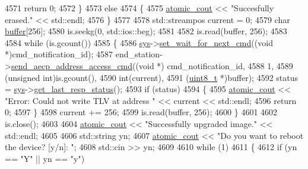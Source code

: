 \begin{DoxyCode}
4571             \textcolor{keywordflow}{return} 0;
4572         \}
4573         \textcolor{keywordflow}{else}
4574         \{
4575             \hyperlink{cmd__line_8h_a0bc38ccc65c79ba06c6fcd7b4bf554c3}{atomic\_cout} << \textcolor{stringliteral}{"Succesfully erased."} << std::endl;
4576         \}
4577 
4578         std::streampos current = 0;
4579         \textcolor{keywordtype}{char} \hyperlink{_hello_test_8cpp_a8be6d469a7cd1c8d66cc6d2d1e10c65b}{buffer}[256];
4580         is.seekg(0, std::ios::beg);
4581 
4582         is.read(buffer, 256);
4583 
4584         \textcolor{keywordflow}{while} (is.gcount())
4585         \{
4586             \hyperlink{classcmd__line_a485db4800e331cb4052c447fdf5d154e}{sys}->\hyperlink{classavdecc__lib_1_1system_a26b769584f10225077da47583edda33e}{set\_wait\_for\_next\_cmd}((\textcolor{keywordtype}{void} *)cmd\_notification\_id);
4587             end\_station->\hyperlink{classavdecc__lib_1_1end__station_acf650400905c50722aab71ac7fa4f44c}{send\_aecp\_address\_access\_cmd}((\textcolor{keywordtype}{void} *)
      cmd\_notification\_id,
4588                                                       1,
4589                                                       (\textcolor{keywordtype}{unsigned} \textcolor{keywordtype}{int})is.gcount(),
4590                                                       int(current),
4591                                                       (\hyperlink{stdint_8h_aba7bc1797add20fe3efdf37ced1182c5}{uint8\_t} *)buffer);
4592             status = \hyperlink{classcmd__line_a485db4800e331cb4052c447fdf5d154e}{sys}->\hyperlink{classavdecc__lib_1_1system_aa63e8d1a4e51f695cdcccc9340922407}{get\_last\_resp\_status}();
4593             \textcolor{keywordflow}{if} (status)
4594             \{
4595                 \hyperlink{cmd__line_8h_a0bc38ccc65c79ba06c6fcd7b4bf554c3}{atomic\_cout} << \textcolor{stringliteral}{"Error: Could not write TLV at address "} << current << std::endl;
4596                 \textcolor{keywordflow}{return} 0;
4597             \}
4598             current += 256;
4599             is.read(buffer, 256);
4600         \}
4601 
4602         is.close();
4603 
4604         \hyperlink{cmd__line_8h_a0bc38ccc65c79ba06c6fcd7b4bf554c3}{atomic\_cout} << \textcolor{stringliteral}{"Successfully upgraded image."} << std::endl;
4605 
4606         std::string yn;
4607         \hyperlink{cmd__line_8h_a0bc38ccc65c79ba06c6fcd7b4bf554c3}{atomic\_cout} << \textcolor{stringliteral}{"Do you want to reboot the device? [y/n]: "};
4608         std::cin >> yn;
4609 
4610         \textcolor{keywordflow}{while} (1)
4611         \{
4612             \textcolor{keywordflow}{if} (yn == \textcolor{stringliteral}{"Y"} || yn == \textcolor{stringliteral}{"y"})

\end{DoxyCode}
